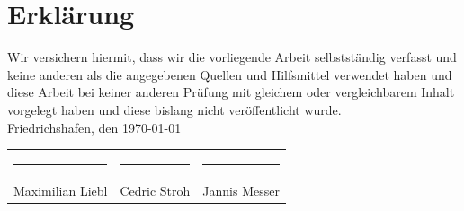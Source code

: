 \chapter*{Erklärung}

Wir versichern hiermit, dass wir die vorliegende Arbeit selbstständig verfasst und keine anderen als die angegebenen Quellen und Hilfsmittel verwendet haben und diese Arbeit bei keiner anderen Prüfung mit gleichem oder vergleichbarem Inhalt vorgelegt haben und diese bislang nicht veröffentlicht wurde.
\\[2ex]

Friedrichshafen, den \today

\vspace{2cm}

\begin{tabular}{p{4.5cm}p{4.5cm}p{4.5cm}}
\rule[-0.2cm]{4cm}{0.5pt} & \rule[-0.2cm]{4cm}{0.5pt} & \rule[-0.2cm]{4cm}{0.5pt} \\
Maximilian Liebl & Cedric Stroh & Jannis Messer
\end{tabular}

\vspace*{4ex}

\rmfamily
\thispagestyle{empty}
